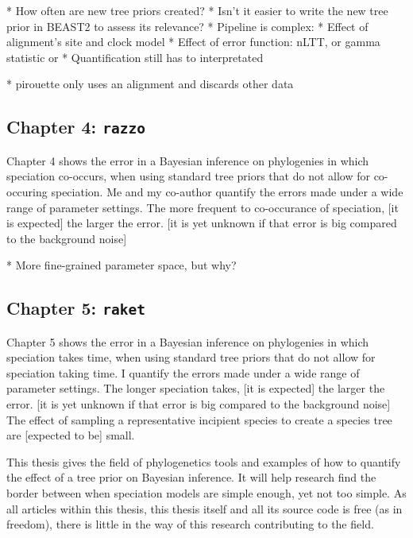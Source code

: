  * How often are new tree priors created?
 * Isn't it easier to write the new tree prior in BEAST2 to assess its
   relevance?
 * Pipeline is complex:
   * Effect of alignment's site and clock model
   * Effect of error function: nLTT, or gamma statistic or 
 * Quantification still has to interpretated

 * pirouette only uses an alignment and discards other data

\subsection{Chapter 4: \texttt{razzo}}

Chapter 4 shows the error in a Bayesian inference on
phylogenies in which speciation co-occurs, when using standard
tree priors that do not allow for co-occuring speciation.
Me and my co-author quantify the errors made under a wide range
of parameter settings. The more frequent to co-occurance of speciation,
[it is expected] the larger the error. 
[it is yet unknown if that error is big compared to the background noise]

 * More fine-grained parameter space, but why?

\subsection{Chapter 5: \texttt{raket}}

Chapter 5 shows the error in a Bayesian inference on
phylogenies in which speciation takes time, when using standard
tree priors that do not allow for speciation taking time.
I quantify the errors made under a wide range
of parameter settings. The longer speciation takes, [it is expected] the larger the error. 
[it is yet unknown if that error is big compared to the background noise]
The effect of sampling a representative incipient species to create
a species tree are [expected to be] small.

This thesis gives the field of phylogenetics tools and examples of
how to quantify the effect of a tree prior on Bayesian inference.
It will help research find the border between when speciation models are
simple enough, yet not too simple. As all articles within this thesis,
this thesis itself and all its source code is free (as in freedom),
there is little in the way of this research contributing to the field. 


